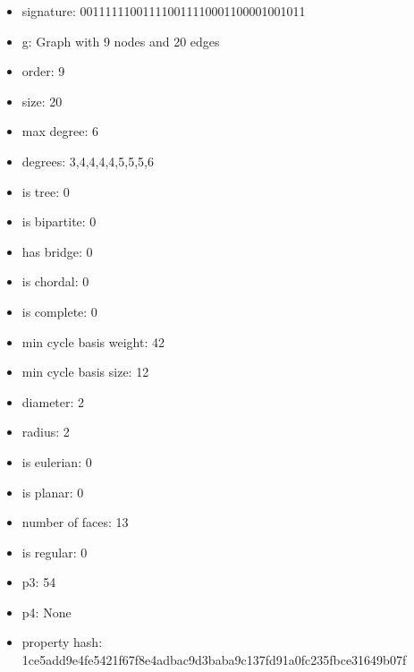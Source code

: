 \newpage
\begin{figure}
\end{figure}
\begin{itemize}
\item signature: 001111110011110011110001100001001011
\item g: Graph with 9 nodes and 20 edges
\item order: 9
\item size: 20
\item max degree: 6
\item degrees: 3,4,4,4,4,5,5,5,6
\item is tree: 0
\item is bipartite: 0
\item has bridge: 0
\item is chordal: 0
\item is complete: 0
\item min cycle basis weight: 42
\item min cycle basis size: 12
\item diameter: 2
\item radius: 2
\item is eulerian: 0
\item is planar: 0
\item number of faces: 13
\item is regular: 0
\item p3: 54
\item p4: None
\item property hash: 1ce5add9e4fe5421f67f8e4adbac9d3baba9c137fd91a0fc235fbce31649b07f
\end{itemize}
